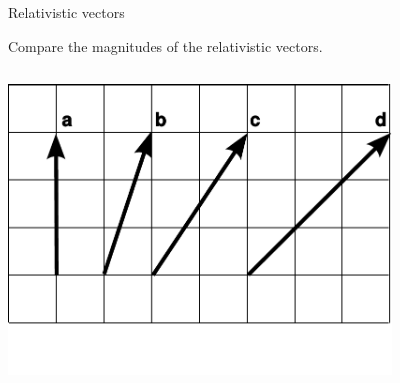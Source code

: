\begin{frame}{Relativistic vectors}

\dq
Compare the magnitudes of the relativistic vectors.

  \begin{mycolumns}

    \begin{column}{.4\textwidth}\includegraphics[width=4in]{ch04/figs/leaning-vectors}\end{column}

    \begin{column}{.6\textwidth}

    \end{column}
  \end{mycolumns}

\end{frame}

